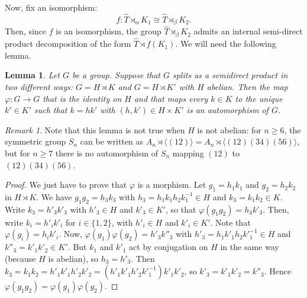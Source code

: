 \documentclass[a4paper, 11pt]{amsart}
\newtheorem{lemme}[te]{Lemma}
\theoremstyle{definition}
\theoremstyle{remark}
\newtheorem{rk}[te]{Remark}
\renewcommand{\geq}{\geqslant}
\begin{document}
\smallskip \noindent
Now, fix an isomorphism:
\[f: \widehat{T} \rtimes_\alpha K_1 \cong \widehat{T} \rtimes_\beta K_2.\]Then, since $f$ is an isomorphism, the group $\widehat{T} \rtimes_\beta K_2$ admits an internal semi-direct product decomposition of the form $\widehat{T} \rtimes f(K_1)$. We will need the following lemma.

\begin{lemme}\label{WLOG}Let $G$ be a group. Suppose that $G$ splits as a semidirect product in two different ways: $G=H\rtimes K$ and $G=H\rtimes K'$ with $H$ abelian. Then the map $\varphi : G\rightarrow G$ that is the identity on $H$ and that maps every $k\in K$ to the unique $k'\in K'$ such that $k=hk'$ with $(h,k')\in H\times K'$ is an automorphism of $G$.
\end{lemme}

\begin{rk}
Note that this lemma is not true when $H$ is not abelian: for $n\geq 6$, the symmetric group $S_n$ can be written as $A_n\rtimes \langle (12)\rangle=A_n\rtimes \langle (12)(34)(56)\rangle$, but for $n\geq 7$ there is no automorphism of $S_n$ mapping $(12)$ to $(12)(34)(56)$.
\end{rk}

\begin{proof}
We just have to prove that $\varphi$ is a morphism. Let $g_1=h_1k_1$ and $g_2=h_2k_2$ in $H\rtimes K$. We have $g_1g_2=
h_3k_3$ with $h_3=h_1k_1h_2k^{-1}_1\in H$ and $k_3=k_1k_2\in K$. Write $k_3=h'_{3}k'_3$ with $h'_3\in H$ and $k'_3\in K'$, so that $\varphi(g_1g_2)=h_3k'_3$. Then, write $k_i=h'_ik'_i$ for $i\in\lbrace 1,2\rbrace$, with $h'_i\in H$ and $k'_i\in K'$. Note that $\varphi(g_i)=h_ik'_i$. Now, $\varphi(g_1)\varphi(g_2)=h'_3k''_3$ with $h'_3=h_1k'_1h_2k'^{-1}_1\in H$ and $k''_3=k'_1k'_2\in K'$. But $k_1$ and $k'_1$ act by conjugation on $H$ in the same way (because $H$ is abelian), so $h_3=h'_3$. Then $k_3=k_1k_2=h'_1k'_1h'_2k'_2=(h'_1k'_1h'_2k'^{-1}_1)k'_1k'_2$, so $k'_3=k'_1k'_2=k''_3$. Hence $\varphi(g_1g_2)=\varphi(g_1)\varphi(g_2)$.\end{proof}

\end{document}
